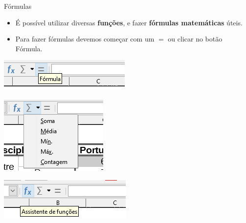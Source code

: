 \begin{frame}{Fórmulas}
	\begin{block}{}
		\begin{itemize}
			\item É possível utilizar diversas \textbf{funções}, e fazer \textbf{fórmulas matemáticas} úteis.
			\item Para fazer fórmulas devemos começar com um $ = $ ou clicar no botão Fórmula.
		\end{itemize}
	\end{block}

	\bigskip
	
	\begin{minipage}{0.3\linewidth}
		\centering
		\includegraphics[width=1\linewidth]{Figuras/Ch06/fig38}
	\end{minipage}\hfill
	\begin{minipage}{0.3\linewidth}
		\centering
		\includegraphics[width=1\linewidth]{Figuras/Ch06/fig39}
	\end{minipage}\hfill
	\begin{minipage}{0.3\linewidth}
		\centering
		\includegraphics[width=1\linewidth]{Figuras/Ch06/fig40}
	\end{minipage}
\end{frame}


